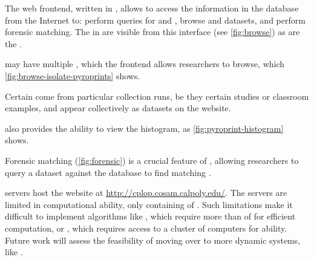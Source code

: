 The web frontend, written in \php{}, allows \cplop{} to access the information in the database from the Internet to: perform queries for \isols{} and \pyros{}, browse \isol{} and \pyro{} datasets, and perform forensic matching. 
The \isols{} in \cplop{} are visible from this interface (see \autoref{fig:browse}) as are the \pyros{}.

\Isols{} may have multiple \pyros{}, which the \cplop{} frontend allows researchers to browse, which \autoref{fig:browse-isolate-pyroprints} shows.

Certain \isols{} come from particular collection runs, be they certain studies or classroom examples, and appear collectively as datasets on the website.

\cplop{} also provides the ability to view the \pyro{} histogram, as \autoref{fig:pyroprint-histogram} shows.

Forensic matching (\autoref{fig:forensic}) is a crucial feature of \cplop{}, allowing researchers to query a dataset against the \cplop{} database to find matching \isols{}.


\cp{} servers host the \cplop{} website at \url{http://cplop.cosam.calpoly.edu/}.
The servers are limited in computational ability, only containing  of \ram{}.
Such limitations make it difficult to implement algorithms like \ohclust{} \cite{montana2013algorithms, montana2013ontological, montana2012investigating}, which require more than  of \ram{} for efficient computation, or \cite{adams2016using}, which requires access to a cluster of computers for \mapreduce{} ability.
Future work will assess the feasibility of moving over to more dynamic systems, like \awslong{}.